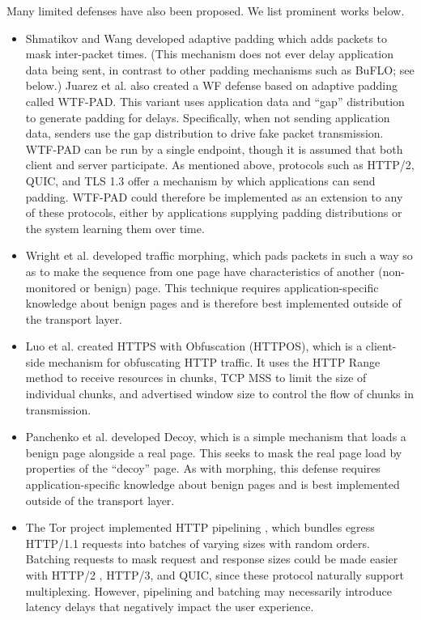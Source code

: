 \documentclass[runningheads]{llncs}
\begin{document}
Many limited defenses have also been proposed. We list prominent works below.
%
\begin{itemize}
\item Shmatikov and Wang \cite{shmatikov2006timing} developed adaptive padding which adds packets to mask
inter-packet times. (This mechanism does not ever delay application data being sent, in contrast to other
padding mechanisms such as BuFLO; see below.)
Juarez et al. \cite{juarez2015wtf,juarez2016toward} also created a WF defense based on adaptive padding called WTF-PAD.
This variant uses application data and ``gap'' distribution to generate padding for delays. Specifically, when
not sending application data, senders use the gap distribution to drive fake packet transmission.
WTF-PAD can be run by a single endpoint, though it is assumed that both client and server participate.
As mentioned above, protocols such as HTTP/2, QUIC, and TLS 1.3 offer a mechanism by which applications can
send padding. WTF-PAD could therefore be implemented as an extension to any of these protocols, either by
applications supplying padding distributions or the system learning them over time.

\item Wright et al. \cite{wright2009traffic} developed traffic morphing, which pads packets in such a way
so as to make the sequence from one page have characteristics of another (non-monitored or benign) page.
This technique requires application-specific knowledge about benign pages and is therefore best implemented
outside of the transport layer.

\item Luo et al. \cite{luo2011httpos} created HTTPS with Obfuscation (HTTPOS), which is a client-side
mechanism for obfuscating HTTP traffic. It uses the HTTP Range method to receive resources in chunks, TCP
MSS to limit the size of individual chunks, and advertised window size to control the flow of chunks
in transmission.

\item Panchenko et al. \cite{panchenko2011website} developed Decoy, which is a simple mechanism that loads
a benign page alongside a real page. This seeks to mask the real page load by properties of the ``decoy'' page.
As with morphing, this defense requires application-specific knowledge about benign pages and is best
implemented outside of the transport layer.

\item The Tor project implemented HTTP pipelining \cite{perry2011experimental}, which bundles egress HTTP/1.1
requests into batches of varying sizes with random orders. Batching requests to mask request and response sizes
could be made easier with HTTP/2 \cite{rfc7540}, HTTP/3, and QUIC, since these protocol naturally support
multiplexing. However, pipelining and batching may necessarily introduce latency delays that negatively impact
the user experience.


\end{itemize}
\end{document}
